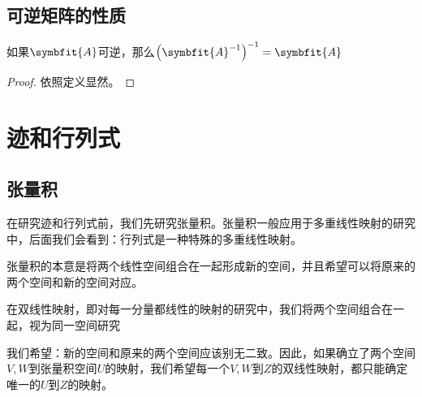 \documentclass[12pt, a4paper, oneside, UTF8]{ctexbook}
\begin{document}
		\subsection{可逆矩阵的性质}
			\begin{para}{0}
				\point{}
					\begin{proposition}
						如果$\symbfit{A}$可逆，那么$\left(\symbfit{A}^{-1}\right)^{-1}=\symbfit{A}$
					\end{proposition}
					\begin{proof}
						依照定义显然。
					\end{proof}
			\end{para}
	\section{迹和行列式}
		\subsection{张量积}
			在研究迹和行列式前，我们先研究张量积。张量积一般应用于多重线性映射的研究中，后面我们会看到：行列式是一种特殊的多重线性映射。

			张量积的本意是将两个线性空间组合在一起形成新的空间，并且希望可以将原来的两个空间和新的空间对应。

			在双线性映射，即对每一分量都线性的映射的研究中，我们将两个空间组合在一起，视为同一空间研究

			我们希望：新的空间和原来的两个空间应该别无二致。因此，如果确立了两个空间$V,W$到张量积空间$U$的映射，我们希望每一个$V,W$到$Z$的双线性映射，都只能确定唯一的$U$到$Z$的映射。
\end{document}
